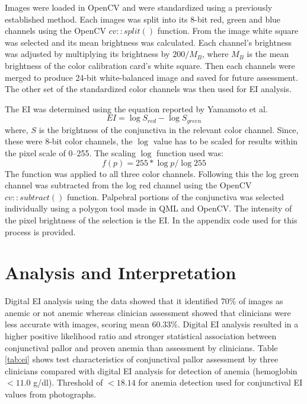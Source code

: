 \documentclass[peerreview]{IEEEtran}
\begin{document}
Images were loaded in OpenCV and were standardized using a previously established method\cite{zhao2013quantitative}.
Each images was split into its 8-bit red, green and blue channels using the OpenCV $cv::split()$ function. From the image 
white square was selected and its mean brightness was calculated. Each channel's brightness was adjusted by multiplying 
its brightness by $200/M_B$, where $M_B$ is the mean brightness of the color calibration card's white square. Then each 
channels were merged to produce 24-bit white-balanced image and saved for future assessment. The other set of the 
standardized color channels was then used for EI analysis.

The EI was determined using the equation reported by Yamamoto et al\cite{yamamoto2008derivation,bersha2010spectral}.
\begin{equation}
 EI = \log{S_{red}} - \log{S_{green}}
\end{equation}
where, $S$ is the brightness of the conjunctiva in the relevant color channel. Since, these were 8-bit color channels, 
the $\log$ value has to be scaled for results within the pixel scale of 0--255. The scaling $\log$ function used was:
\begin{equation}
 f(p) = 255 * \log{p}/\log{255}
\end{equation}
The function was applied to all three color channels. Following this the log green channel was subtracted from the log red channel
using the OpenCV $cv::subtract()$ function. Palpebral portions of the conjunctiva was selected individually using a polygon tool
made in QML and OpenCV. The intensity of the pixel brightness of the selection is the EI.
In the appendix code used for this process is provided.

\section{Analysis and Interpretation}

Digital EI analysis using the data\cite{L4MDKC_2015} showed that it identified 70\% of images as anemic or not anemic whereas 
clinician assessment showed that clinicians were less accurate with images, scoring mean 60.33\%. Digital EI analysis resulted
in a higher positive likelihood ratio and stronger statistical association between conjunctival pallor and proven anemia than
assessment by clinicians. Table \ref{tab:ei} shows test characteristics of conjunctival pallor assessment by three clinicians compared with digital EI analysis
for detection of anemia (hemoglobin $< 11.0$ g/dl). Threshold of $< 18.14$ for anemia detection used for conjunctival
EI values from photographs\cite{10.1371/journal.pone.0153286}.
\end{document}
